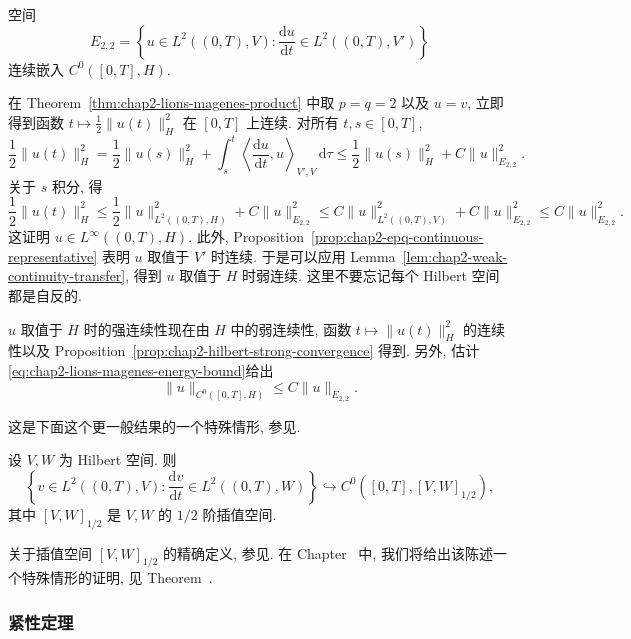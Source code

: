 \begin{Theorem}
\label{thm:chap2-lions-magenes-continuity-h}
空间
\[
 E_{2,2}=\left\{u\in L^2((0,T),V):\frac{\mathrm{d}u}{\mathrm{d}t}\in L^2((0,T),V')\right\}
\]
连续嵌入 $C^0([0,T],H)$.
\end{Theorem}

\begin{Proof}
在 Theorem~\ref{thm:chap2-lions-magenes-product} 中取 $p=q=2$ 以及 $u=v$, 立即得到函数 $t\mapsto\frac12\|u(t)\|_H^2$ 在 $[0,T]$ 上连续. 对所有 $t,s\in[0,T]$,
\[
 \frac12\|u(t)\|_H^2
 =\frac12\|u(s)\|_H^2
 +\int_s^t\left\langle\frac{\mathrm{d}u}{\mathrm{d}t},u\right\rangle_{V',V}\,\mathrm{d}\tau
 \leq\frac12\|u(s)\|_H^2+C\|u\|_{E_{2,2}}^2.
\]
关于 $s$ 积分, 得
\begin{equation}
 \frac12\|u(t)\|_H^2
 \leq\frac12\|u\|_{L^2((0,T),H)}^2+C\|u\|_{E_{2,2}}^2
 \leq C\|u\|_{L^2((0,T),V)}^2+C\|u\|_{E_{2,2}}^2
 \leq C\|u\|_{E_{2,2}}^2.
 \label{eq:chap2-lions-magenes-energy-bound}
\end{equation}
这证明 $u\in L^\infty((0,T),H)$. 此外, Proposition~\ref{prop:chap2-epq-continuous-representative} 表明 $u$ 取值于 $V'$ 时连续. 于是可以应用 Lemma~\ref{lem:chap2-weak-continuity-transfer}, 得到 $u$ 取值于 $H$ 时弱连续. 这里不要忘记每个 Hilbert 空间都是自反的.

$u$ 取值于 $H$ 时的强连续性现在由 $H$ 中的弱连续性, 函数 $t\mapsto\|u(t)\|_H^2$ 的连续性以及 Proposition~\ref{prop:chap2-hilbert-strong-convergence} 得到. 另外, 估计\eqref{eq:chap2-lions-magenes-energy-bound}给出
\[
 \|u\|_{C^0([0,T],H)}\leq C\|u\|_{E_{2,2}}.
\]
\end{Proof}

这是下面这个更一般结果的一个特殊情形, 参见.

\begin{Theorem}
\label{thm:chap2-interpolation-time-continuity}
设 $V,W$ 为 Hilbert 空间. 则
\[
 \left\{v\in L^2((0,T),V):\frac{\mathrm{d}v}{\mathrm{d}t}\in L^2((0,T),W)\right\}
 \hookrightarrow C^0([0,T],[V,W]_{1/2}),
\]
其中 $[V,W]_{1/2}$ 是 $V,W$ 的 $1/2$ 阶插值空间.
\end{Theorem}

关于插值空间 $[V,W]_{1/2}$ 的精确定义, 参见. 在 Chapter~ 中, 我们将给出该陈述一个特殊情形的证明, 见 Theorem~.

\subsubsection{紧性定理}
\label{subsec:chap2-time-compactness}

